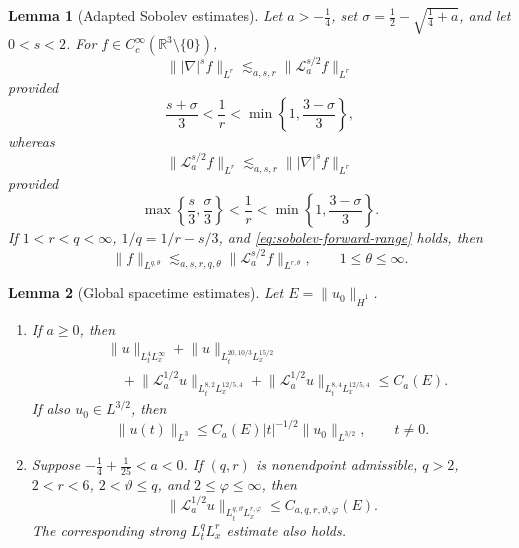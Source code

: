 \documentclass[10pt,a4paper]{amsart}
\newtheorem{lemma}{Lemma}
\newcommand{\R}{\mathbb R}
\newcommand{\cL}{\mathcal L}
\newcommand{\norm}[2]{\lVert #1\rVert_{#2}}
\begin{document}
\begin{lemma}[Adapted Sobolev estimates]
\label{lem:adapted-sobolev}
Let $a>-\frac14$, set
$\sigma=\frac12-\sqrt{\frac14+a}$, and let $0<s<2$. For
$f\in C_c^\infty(\R^3\setminus\{0\})$,
\[
 \norm{|\nabla|^sf}{L^r}
 \lesssim_{a,s,r}\norm{\cL_a^{s/2}f}{L^r}
\]
provided
\begin{equation}
 \frac{s+\sigma}{3}<\frac1r<
 \min\left\{1,\frac{3-\sigma}{3}\right\},
 \label{eq:sobolev-forward-range}
\end{equation}
whereas
\[
 \norm{\cL_a^{s/2}f}{L^r}
 \lesssim_{a,s,r}\norm{|\nabla|^sf}{L^r}
\]
provided
\[
 \max\left\{\frac{s}{3},\frac{\sigma}{3}\right\}<\frac1r<
 \min\left\{1,\frac{3-\sigma}{3}\right\}.
\]
If $1<r<q<\infty$, $1/q=1/r-s/3$, and
\eqref{eq:sobolev-forward-range} holds, then
\begin{equation}
 \norm{f}{L^{q,\theta}}
 \lesssim_{a,s,r,q,\theta}
 \norm{\cL_a^{s/2}f}{L^{r,\theta}},
 \qquad 1\leq\theta\leq\infty.
 \label{eq:adapted-embedding}
\end{equation}
\end{lemma}

\begin{lemma}[Global spacetime estimates]
\label{lem:global-spacetime}
Let $E=\norm{u_0}{\dot H^1}$.
\begin{enumerate}
 \item If $a\geq0$, then
 \begin{equation}
 \begin{split}
  &\norm{u}{L_t^4L_x^\infty}
  +\norm{u}{L_t^{20,10/3}L_x^{15/2}}\\
  &\quad
  +\norm{\cL_a^{1/2}u}{L_t^{8,2}L_x^{12/5,4}}
  +\norm{\cL_a^{1/2}u}{L_t^{8,4}L_x^{12/5,4}}
  \leq C_a(E).
 \end{split}
 \label{eq:nonnegative-spacetime}
 \end{equation}
 If also $u_0\in L^{3/2}$, then
 \[
  \norm{u(t)}{L^3}
  \leq C_a(E)|t|^{-1/2}\norm{u_0}{L^{3/2}},
  \qquad t\neq0.
 \]
 \item Suppose $-\frac14+\frac1{25}<a<0$. If $(q,r)$ is
 nonendpoint admissible, $q>2$, $2<r<6$, $2<\vartheta\leq q$, and
 $2\leq\varphi\leq\infty$, then
 \begin{equation}
  \norm{\cL_a^{1/2}u}{L_t^{q,\vartheta}L_x^{r,\varphi}}
  \leq C_{a,q,r,\vartheta,\varphi}(E).
  \label{eq:attractive-spacetime}
 \end{equation}
 The corresponding strong $L_t^qL_x^r$ estimate also holds.
\end{enumerate}
\end{lemma}
\end{document}
